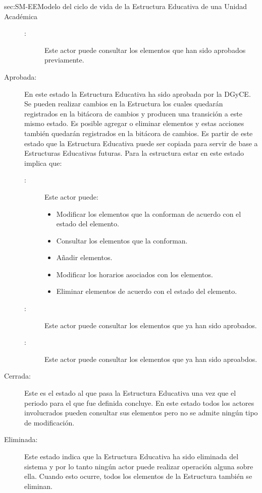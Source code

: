 \begin{Maquina}{sec:SM-EE}{Modelo del ciclo de vida de la Estructura Educativa de una Unidad Académica}
\begin{description}
\begin{description}
	\item[:] Este actor puede consultar los elementos que han sido aprobados previamente.
	
\end{description}

\item[Aprobada:] En este estado la Estructura Educativa ha sido aprobada por la DGyCE. Se pueden realizar cambios en la Estructura los cuales quedarán registrados en la bitácora de cambios y producen una transición a este mismo estado. Es posible agregar o eliminar elementos y estas acciones también quedarán registrados en la bitácora de cambios. Es partir de este estado que la Estructura Educativa puede ser copiada para servir de base a Estructuras Educativas futuras. Para la estructura estar en este estado implica que:
	\begin{description}
		\item[:] Este actor puede:
		\begin{itemize} 
			\item Modificar los elementos que la conforman de acuerdo con el estado del elemento.
			\item Consultar los elementos que la conforman.
			\item Añadir elementos.
			\item Modificar los horarios asociados con los elementos.
			\item Eliminar elementos de acuerdo con el estado del elemento.
		\end{itemize}
		
		\item[:] Este actor puede consultar los elementos que ya han sido aprobados.
		
		\item[:] Este actor puede consultar los elementos que ya han sido aproabdos.
	\end{description}

\item[Cerrada:] Este es el estado al que pasa la Estructura Educativa una vez que el periodo para el que fue definida concluye. En este estado todos los actores involucrados pueden consultar sus elementos pero no se admite ningún tipo de modificación. 

\item[Eliminada:] Este estado indica que la Estructura Educativa ha sido eliminada del sistema y por lo tanto ningún actor puede realizar operación alguna sobre ella. Cuando esto ocurre, todos los elementos de la Estructura también se eliminan.


\end{description}
\end{Maquina}
